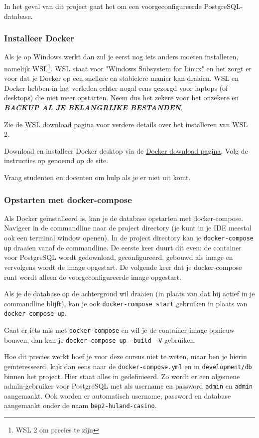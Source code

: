 In het geval van dit project gaat het om een voorgeconfigureerde PostgreSQL-database.

\subsubsection{Installeer Docker}

Als je op Windows werkt dan zul je eerst nog iets anders moeten installeren, namelijk WSL\footnote{WSL 2 om precies te zijn}.
WSL staat voor "Windows Subsystem for Linux" en het zorgt er voor dat je Docker op een 
snellere en stabielere manier kan draaien. 
WSL en Docker hebben in het verleden echter nogal eens gezorgd voor laptops (of desktops) die niet meer opstarten.
Neem dus het zekere voor het onzekere en \textbf{\emph{BACKUP AL JE BELANGRIJKE BESTANDEN}}.

Zie de 
\href{https://learn.microsoft.com/en-us/windows/wsl/install}{WSL download pagina} voor verdere details
over het installeren van WSL 2.

Download en installeer Docker desktop via de 
\href{https://www.docker.com/products/docker-desktop}{Docker download pagina}.
Volg de instructies op genoemd op de site.

Vraag studenten en docenten om hulp als je er niet uit komt.

\subsubsection{Opstarten met docker-compose}
Als Docker geïnstalleerd is, kan je de database opstarten met docker-compose.
Navigeer in de commandline naar de project directory (je kunt in je IDE meestal ook een terminal window openen).
In de project directory kan je \texttt{docker-compose up} draaien vanaf de commandline. 
De eerste keer duurt dit even: de container voor PostgreSQL wordt gedownload, geconfigureerd,
gebouwd als image en vervolgens wordt de image opgestart.
De volgende keer dat je docker-compose runt wordt alleen de voorgeconfigureerde image opgestart.

Als je de database op de achtergrond wil draaien (in plaats van dat hij actief in je commandline blijft),
kan je ook \texttt{docker-compose start} gebruiken in plaats van \texttt{docker-compose up}.

Gaat er iets mis met \texttt{docker-compose} en wil je de container image opnieuw bouwen,
dan kan je \texttt{docker-compose up --build -V} gebruiken.

Hoe dit precies werkt hoef je voor deze cursus niet te weten,
maar ben je hierin geïnteresseerd, kijk dan eens naar de \texttt{docker-compose.yml}
en in \texttt{development/db} binnen het project. Hier staat alles in gedefinieerd.
Zo wordt er een algemene admin-gebruiker voor PostgreSQL met als username en password 
\texttt{admin} en \texttt{admin} aangemaakt. Ook worden er automatisch username, password en database 
aangemaakt onder de naam \texttt{bep2-huland-casino}.

